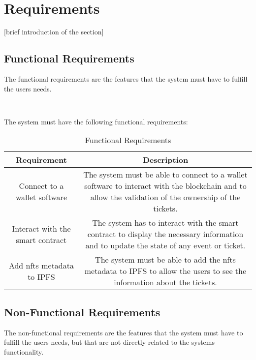 \section{Requirements}
\label{sec:requirements}

[brief introduction of the section]




\subsection{Functional Requirements}
\label{subsec:functional_requirements}

The functional requirements are the features that the system must have to fulfill the users needs.

~

The system must have the following functional requirements:

\begin{table}[H]
    \caption{Functional Requirements}
    \label{tab:functional_requirements}
    \begin{tabular}{|c|c|}
        \hline
        \textbf{Requirement}             & \textbf{Description}                                                                                                                                 \\
        \hline
        Connect to a wallet software     & The system must be able to connect to a wallet software to interact with the blockchain and to allow the validation of the ownership of the tickets. \\
        \hline
        Interact with the smart contract & The system has to interact with the smart contract to display the necessary information and to update the state of any event or ticket.              \\
        \hline
        Add nfts metadata to IPFS        & The system must be able to add the nfts metadata to IPFS to allow the users to see the information about the tickets.                                \\
        \hline
    \end{tabular}
\end{table}


\subsection{Non-Functional Requirements}
\label{subsec:non_functional_requirements}

The non-functional requirements are the features that the system must have to fulfill the users needs, but that are not directly related to the systems functionality.

